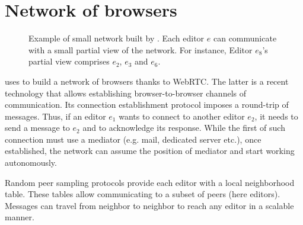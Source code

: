 
\section{Network of browsers}
\label{sec:network}

\begin{figure}
  \centering
  
  \caption{Example of small network built by \SPRAY. Each editor $e$ can
    communicate with a small partial view of the network. For instance, Editor
    $e_8$'s partial view comprises $e_2$, $e_3$ and $e_6$.}
  \label{fig:spray}
\end{figure}


\CRATE uses \SPRAY to build a network of browsers thanks to WebRTC. The latter
is a recent technology that allows establishing browser-to-browser channels of
communication. Its connection establishment protocol imposes a round-trip of
messages. Thus, if an editor $e_1$ wants to connect to another editor $e_2$, it
needs to send a message to $e_2$ and to acknowledge its response. While the
first of such connection must use a mediator (e.g. mail, dedicated server etc.),
once established, the network can assume the position of mediator and start
working autonomously.

Random peer sampling protocols provide each editor with a local neighborhood
table. These tables allow communicating to a subset of peers (here
editors). Messages can travel from neighbor to neighbor to reach any editor in a
scalable manner.



